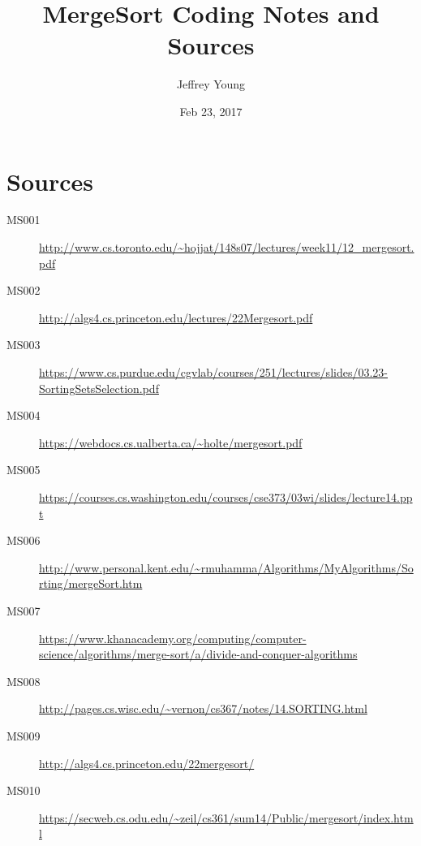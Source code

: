 \documentclass[10pt, letterpaper]{article}
\author{Jeffrey Young}
\date{Feb 23, 2017}
\title{MergeSort Coding Notes and Sources}
\begin{document}
\maketitle

\section*{Sources}
\label{sec:org2c721ad}
\begin{description}
\item[{MS001}] \url{http://www.cs.toronto.edu/\~hojjat/148s07/lectures/week11/12\_mergesort.pdf}
\item[{MS002}] \url{http://algs4.cs.princeton.edu/lectures/22Mergesort.pdf}
\item[{MS003}] \url{https://www.cs.purdue.edu/cgvlab/courses/251/lectures/slides/03.23-SortingSetsSelection.pdf}
\item[{MS004}] \url{https://webdocs.cs.ualberta.ca/\~holte/mergesort.pdf}
\item[{MS005}] \url{https://courses.cs.washington.edu/courses/cse373/03wi/slides/lecture14.ppt}
\item[{MS006}] \url{http://www.personal.kent.edu/\~rmuhamma/Algorithms/MyAlgorithms/Sorting/mergeSort.htm}
\item[{MS007}] \url{https://www.khanacademy.org/computing/computer-science/algorithms/merge-sort/a/divide-and-conquer-algorithms}
\item[{MS008}] \url{http://pages.cs.wisc.edu/\~vernon/cs367/notes/14.SORTING.html}
\item[{MS009}] \url{http://algs4.cs.princeton.edu/22mergesort/}
\item[{MS010}] \url{https://secweb.cs.odu.edu/\~zeil/cs361/sum14/Public/mergesort/index.html}
\end{description}
\end{document}
